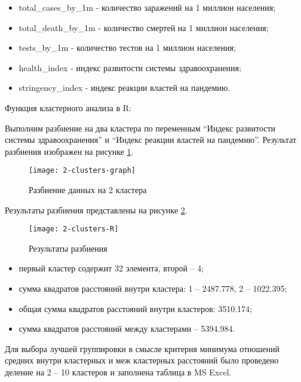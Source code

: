 \documentclass[a4paper,14pt]{extarticle}
\begin{document}
\begin{itemize}
    \item total\_cases\_by\_1m - количество заражений на 1 миллион населения;
    \item total\_death\_by\_1m - количество смертей на 1 миллион населения;
    \item tests\_by\_1m - количество тестов на 1 миллион населения;
    \item health\_index - индекс развитости системы здравоохранения;
    \item stringency\_index - индекс реакции властей на пандемию.
\end{itemize}

Функция кластерного анализа в R:


Выполним разбиение на два кластера по переменным \enquote{Индекс развитости системы здравоохранения} и
\enquote{Индекс реакции властей на пандемию}. Результат разбиения изображен на рисунке
\ref{fig:2-clusters-graph}.

\begin{figure}[H]
    \centering
    \texttt{[image: 2-clusters-graph]}
    \caption{Разбиение данных на 2 кластера}
    \label{fig:2-clusters-graph}
\end{figure}
\pagebreak

Результаты разбиения представлены на рисунке \ref{fig:2-clusters-R}.

\begin{figure}[H]
    \centering
    \texttt{[image: 2-clusters-R]}
    \caption{Результаты разбиения}
    \label{fig:2-clusters-R}
\end{figure}

\begin{itemize}
    \item первый кластер содержит 32 элемента, второй – 4;
    \item сумма квадратов расстояний внутри кластера: 1 – 2487.778, 2 – 1022.395;
    \item общая сумма квадратов расстояний внутри кластеров: 3510.174;
    \item сумма квадратов расстояний между кластерами – 5394.984.
\end{itemize}

Для выбора лучшей группировки в смысле критерия минимума отношений средних
внутри кластерных и меж кластерных расстояний было проведено деление на 2 – 10
кластеров и заполнена таблица в MS Excel.
\end{document}
